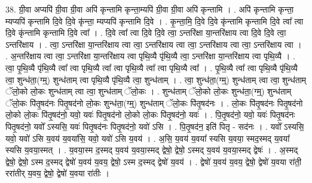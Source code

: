\documentclass[17pt]{extarticle}
\begin{document}
38. ग्री॒वा अप्यपि॑ ग्री॒वा ग्री॒वा अपि॑ कृन्तामि कृन्ता॒म्यपि॑ ग्री॒वा ग्री॒वा अपि॑ कृन्तामि । . अपि॑ कृन्तामि कृन्ता॒ म्यप्यपि॑ कृन्तामि दि॒वे दि॒वे कृ॑न्ता॒ म्यप्यपि॑ कृन्तामि दि॒वे । . कृ॒न्ता॒मि॒ दि॒वे दि॒वे कृ॑न्तामि कृन्तामि दि॒वे त्वा᳚ त्वा दि॒वे कृ॑न्तामि कृन्तामि दि॒वे त्वा᳚ । . दि॒वे त्वा᳚ त्वा दि॒वे दि॒वे त्वा॒ ऽन्तरि॑क्षा या॒न्तरि॑क्षाय त्वा दि॒वे दि॒वे त्वा॒ ऽन्तरि॑क्षाय । . त्वा॒ ऽन्तरि॑क्षा या॒न्तरि॑क्षाय त्वा त्वा॒ ऽन्तरि॑क्षाय त्वा त्वा॒ ऽन्तरि॑क्षाय त्वा त्वा॒ ऽन्तरि॑क्षाय त्वा । . अ॒न्तरि॑क्षाय त्वा त्वा॒ ऽन्तरि॑क्षा या॒न्तरि॑क्षाय त्वा पृथि॒व्यै पृ॑थि॒व्यै त्वा॒ ऽन्तरि॑क्षा या॒न्तरि॑क्षाय त्वा पृथि॒व्यै । . त्वा॒ पृ॒थि॒व्यै पृ॑थि॒व्यै त्वा᳚ त्वा पृथि॒व्यै त्वा᳚ त्वा पृथि॒व्यै त्वा᳚ त्वा पृथि॒व्यै त्वा᳚ । . पृ॒थि॒व्यै त्वा᳚ त्वा पृथि॒व्यै पृ॑थि॒व्यै त्वा॒ शुन्ध॑ता॒(ग्म्॒) शुन्ध॑ताम् त्वा पृथि॒व्यै पृ॑थि॒व्यै त्वा॒ शुन्ध॑ताम् । . त्वा॒ शुन्ध॑ता॒(ग्म्॒) शुन्ध॑ताम् त्वा त्वा॒ शुन्ध॑ताम् ॅलो॒को लो॒कः शुन्ध॑ताम् त्वा त्वा॒ शुन्ध॑ताम् ॅलो॒कः । . शुन्ध॑ताम् ॅलो॒को लो॒कः शुन्ध॑ता॒(ग्म्॒) शुन्ध॑ताम् ॅलो॒कः पि॑तृ॒षद॑नः पितृ॒षद॑नो लो॒कः शुन्ध॑ता॒(ग्म्॒) शुन्ध॑ताम् ॅलो॒कः पि॑तृ॒षद॑नः । . लो॒कः पि॑तृ॒षद॑नः पितृ॒षद॑नो लो॒को लो॒कः पि॑तृ॒षद॑नो॒ यवो॒ यवः॑ पितृ॒षद॑नो लो॒को लो॒कः पि॑तृ॒षद॑नो॒ यवः॑ । . पि॒तृ॒षद॑नो॒ यवो॒ यवः॑ पितृ॒षद॑नः पितृ॒षद॑नो॒ यवो᳚ ऽस्यसि॒ यवः॑ पितृ॒षद॑नः पितृ॒षद॑नो॒ यवो॑ ऽसि । . पि॒तृ॒षद॑न॒ इति॑ पितृ - सद॑नः । . यवो᳚ ऽस्यसि॒ यवो॒ यवो॑ ऽसि य॒वय॑ य॒वया॑सि॒ यवो॒ यवो॑ ऽसि य॒वय॑ । . अ॒सि॒ य॒वय॑ य॒वया᳚ स्यसि य॒वया॒ स्मद॒स्मद् य॒वया᳚ स्यसि य॒वया॒स्मत् । . य॒वया॒स्म द॒स्मद् य॒वय॑ य॒वया॒स्मद् द्वेषो॒ द्वेषो॒ ऽस्मद् य॒वय॑ य॒वया॒स्मद् द्वेषः॑ । . अ॒स्मद् द्वेषो॒ द्वेषो॒ ऽस्म द॒स्मद् द्वेषो॑ य॒वय॑ य॒वय॒ द्वेषो॒ ऽस्म द॒स्मद् द्वेषो॑ य॒वय॑ । . द्वेषो॑ य॒वय॑ य॒वय॒ द्वेषो॒ द्वेषो॑ य॒वया रा॑ती॒ ररा॑तीर् य॒वय॒ द्वेषो॒ द्वेषो॑ य॒वया रा॑तीः । \newline
\pagebreak
{}
\end{document}
